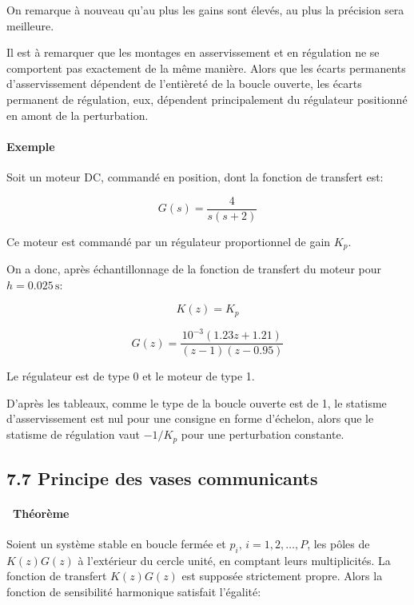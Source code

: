 \documentclass[11pt]{article}
\begin{document}
    On remarque à nouveau qu'au plus les gains sont élevés, au plus la
précision sera meilleure.

    Il est à remarquer que les montages en asservissement et en régulation
ne se comportent pas exactement de la même manière. Alors que les écarts
permanents d'asservissement dépendent de l'entièreté de la boucle
ouverte, les écarts permanent de régulation, eux, dépendent
principalement du régulateur positionné en amont de la perturbation.

    \paragraph{Exemple}\label{exemple}

Soit un moteur DC, commandé en position, dont la fonction de transfert
est:

\[ G(s) = \frac{4}{s(s+2)} \]

Ce moteur est commandé par un régulateur proportionnel de gain \(K_p\).

    On a donc, après échantillonnage de la fonction de transfert du moteur
pour \(h = 0.025\, \mathrm{s}\):

\[ K(z) = K_p \]

\[ G(z) = \frac{10^{-3}(1.23z+1.21)}{(z-1)(z-0.95)} \]

Le régulateur est de type 0 et le moteur de type 1.

    D'après les tableaux, comme le type de la boucle ouverte est de 1, le
statisme d'asservissement est nul pour une consigne en forme d'échelon,
alors que le statisme de régulation vaut \(-1/K_p\) pour une
perturbation constante.

    \subsection{7.7 Principe des vases
communicants}\label{principe-des-vases-communicants}

    \paragraph{~Théorème}\label{thuxe9oruxe8me}

Soient un système stable en boucle fermée et
\(p_i, \, i=1, 2, \dots, P\), les pôles de \(K(z)G(z)\) à l'extérieur du
cercle unité, en comptant leurs multiplicités. La fonction de transfert
\(K(z)G(z)\) est supposée strictement propre. Alors la fonction de
sensibilité harmonique satisfait l'égalité:
\end{document}
